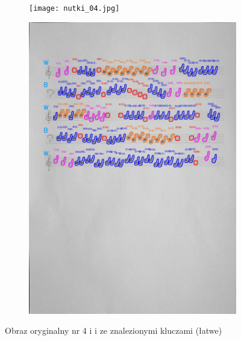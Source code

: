 \documentclass[11pt]{article}
\begin{document}
\begin{figure}[H]
    \centering
    \begin{subfigure}{.5\textwidth}
        \centering
        \graphicspath{ {Resources/} }
        \texttt{[image: nutki\_04.jpg]}
        \label{figsub1}
    \end{subfigure}%
    \begin{subfigure}{.5\textwidth}
        \centering
        \graphicspath{ {keys/} }
        \includegraphics[width=.9\linewidth]{image_4.jpg}
        \label{figsub2}
    \end{subfigure}
    \caption{Obraz oryginalny nr 4 i i ze znalezionymi kluczami (łatwe)}
    \label{figwykKlucze01}
\end{figure}
\end{document}
